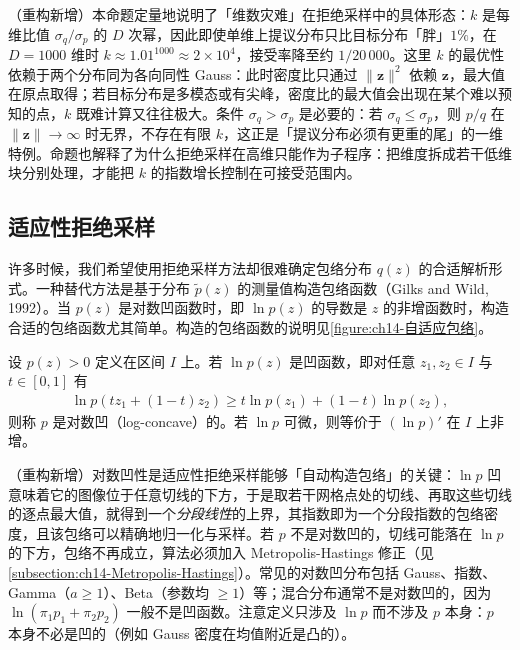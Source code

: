 \documentclass[../../main.tex]{subfiles}
\begin{document}
\begin{remark}（重构新增）本命题定量地说明了「维数灾难」在拒绝采样中的具体形态：$k$ 是每维比值 $\sigma_{q}/\sigma_{p}$ 的 $D$ 次幂，因此即使单维上提议分布只比目标分布「胖」$1\%$，在 $D=1000$ 维时 $k\approx1.01^{1000}\approx2\times10^{4}$，接受率降至约 $1/20\,000$。这里 $k$ 的最优性依赖于两个分布同为各向同性 Gauss：此时密度比只通过 $\lVert\bm{z}\rVert^{2}$ 依赖 $\bm{z}$，最大值在原点取得；若目标分布是多模态或有尖峰，密度比的最大值会出现在某个难以预知的点，$k$ 既难计算又往往极大。条件 $\sigma_{q}>\sigma_{p}$ 是必要的：若 $\sigma_{q}\leqslant\sigma_{p}$，则 $p/q$ 在 $\lVert\bm{z}\rVert\to\infty$ 时无界，不存在有限 $k$，这正是「提议分布必须有更重的尾」的一维特例。命题也解释了为什么拒绝采样在高维只能作为子程序：把维度拆成若干低维块分别处理，才能把 $k$ 的指数增长控制在可接受范围内。
\end{remark}

\subsection{适应性拒绝采样}\label{subsection:ch14-适应性拒绝采样}

许多时候，我们希望使用拒绝采样方法却很难确定包络分布 $q(z)$ 的合适解析形式。一种替代方法是基于分布 $\widetilde{p}(z)$ 的测量值构造包络函数（Gilks and Wild, 1992）。当 $p(z)$ 是对数凹函数时，即 $\ln p(z)$ 的导数是 $z$ 的非增函数时，构造合适的包络函数尤其简单。构造的包络函数的说明见\cref{figure:ch14-自适应包络}。

\begin{definition}[对数凹函数]\label{definition:ch14-对数凹}
设 $p(z)>0$ 定义在区间 $I$ 上。若 $\ln p(z)$ 是凹函数，即对任意 $z_{1},z_{2}\in I$ 与 $t\in[0,1]$ 有
\begin{align*}
\ln p\left(tz_{1}+(1-t)z_{2}\right)\geqslant t\ln p(z_{1})+(1-t)\ln p(z_{2}),
\end{align*}
则称 $p$ 是对数凹（log-concave）的。若 $\ln p$ 可微，则等价于 $\left(\ln p\right)'$ 在 $I$ 上非增。
\end{definition}

\begin{remark}（重构新增）对数凹性是适应性拒绝采样能够「自动构造包络」的关键：$\ln p$ 凹意味着它的图像位于任意切线的下方，于是取若干网格点处的切线、再取这些切线的逐点最大值，就得到一个\emph{分段线性}的上界，其指数即为一个分段指数的包络密度，且该包络可以精确地归一化与采样。若 $p$ 不是对数凹的，切线可能落在 $\ln p$ 的下方，包络不再成立，算法必须加入 Metropolis-Hastings 修正（见\cref{subsection:ch14-Metropolis-Hastings}）。常见的对数凹分布包括 Gauss、指数、Gamma（$a\geqslant1$）、Beta（参数均 $\geqslant1$）等；混合分布通常不是对数凹的，因为 $\ln\left(\pi_{1}p_{1}+\pi_{2}p_{2}\right)$ 一般不是凹函数。注意定义只涉及 $\ln p$ 而不涉及 $p$ 本身：$p$ 本身不必是凹的（例如 Gauss 密度在均值附近是凸的）。
\end{remark}
\end{document}
